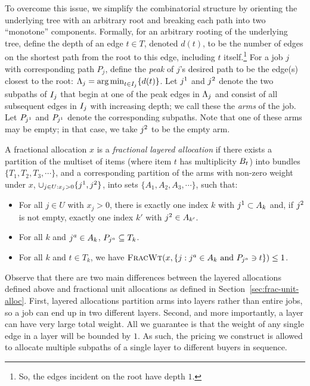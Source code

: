 To overcome this issue, we simplify the combinatorial structure by
orienting the underlying tree with an arbitrary root and breaking each
path into two ``monotone'' components. Formally, for an arbitrary
rooting of the underlying tree, define the depth of an edge $t\in T$,
denoted $d(t)$, to be the number of edges on the shortest path from
the root to this edge, including $t$ itself.\footnote{So, the edges
  incident on the root have depth $1$.} For a job $j$ with
corresponding path $P_j$, define the {\em peak} of $j$'s desired path
to be the edge(s) closest to the root:
${\Lambda_{j}} = \operatorname{arg\,min}_{t \in {I_{j}}} \{d(t)\}$. Let ${{j}^1}$ and ${{j}^2}$
denote the two subpaths of ${I_{j}}$ that begin at one of the peak edges
in ${\Lambda_{j}}$ and consist of all subsequent edges in ${I_{j}}$ with
increasing depth; we call these the {\em arms} of the job. Let
$P_{{{j}^1}}$ and $P_{{{j}^1}}$ denote the corresponding subpaths. Note
that one of these arms may be empty; in that case, we take ${{j}^2}$ to
be the empty arm.

\begin{definition} A fractional allocation $x$ is a {\em fractional
    layered allocation} if there exists a partition of the multiset of
  items (where item $t$ has multiplicity $B_t$) into bundles
  $\{T_1, T_2, T_3, \cdots\}$, and a corresponding partition of the
  arms with non-zero weight under $x$, $\cup_{j\in U: x_j>0} \{{{j}^1},{{j}^2}\}$,
  into sets $\{A_1, A_2, A_3, \cdots\}$, such that:
    \begin{itemize}
        \item For all $j\in U$ with $x_j>0$, there is exactly one
          index $k$ with ${{j}^1}\subset A_k$ and, if ${{j}^2}$ is not
          empty, exactly one index $k'$ with ${{j}^2}\in A_{k'}$. 
          \item For all $k$ and ${{j}^a}\in A_k$, $P_{{{j}^a}}\subseteq T_k$. 
        \item For all $k$ and $t\in T_k$, we have ${\normalfont\textsc{FracWt}}(x,
          \{j: {{j}^a}\in A_k \text{ and } P_{{{j}^a}}\ni t\}) \le 1$.
   \end{itemize}
\end{definition}

Observe that there are two main differences between the layered
allocations defined above and fractional unit allocations as defined
in Section~\ref{sec:frac-unit-alloc}. First, layered allocations partition arms into layers
rather than entire jobs, so a job can end up in two different
layers. Second, and more importantly, a layer can have very large
total weight. All we guarantee is that the weight of any single edge
in a layer will be bounded by $1$. As such, the pricing we construct
is allowed to allocate multiple subpaths of a single layer to
different buyers in
sequence.

